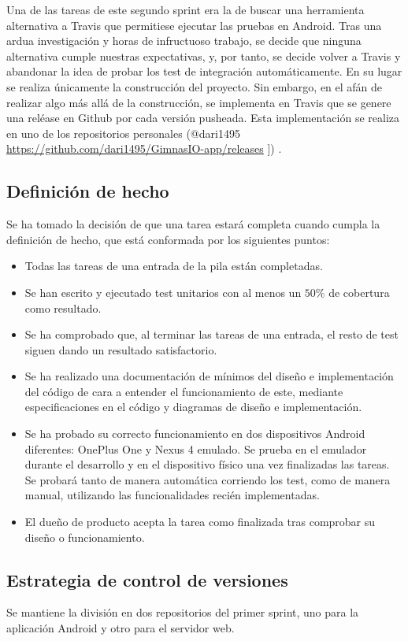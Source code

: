 \documentclass[11pt,a4paper]{report}
\begin{document}
Una de las tareas de este segundo sprint era la de buscar una herramienta alternativa a Travis que permitiese ejecutar las pruebas en Android. Tras una ardua investigación y horas de infructuoso trabajo, se decide que ninguna alternativa cumple nuestras expectativas, y, por tanto, se decide volver a Travis y abandonar la idea de probar los test de integración automáticamente. En su lugar se realiza únicamente la construcción del proyecto. Sin embargo, en el afán de realizar algo más allá de la construcción, se implementa en Travis que se genere una reléase en Github por cada versión pusheada. Esta implementación se realiza en uno de los repositorios personales (@dari1495 \url{https://github.com/dari1495/GimnasIO-app/releases} ]) .
\subsection{Definición de hecho}
Se ha tomado la decisión de que una tarea estará completa cuando cumpla la definición de hecho, que está conformada por los siguientes puntos:
\begin{itemize}
	\item Todas las tareas de una entrada de la pila están completadas.
	\item Se han escrito y ejecutado test unitarios con al menos un $50\%$ de cobertura como resultado.
	\item Se ha comprobado que, al terminar las tareas de una entrada, el resto de test siguen dando un resultado satisfactorio.
	\item Se ha realizado una documentación de mínimos del diseño e implementación del código de cara a entender el funcionamiento de este, mediante especificaciones en el código y diagramas de diseño e implementación.
	\item Se ha probado su correcto funcionamiento en dos dispositivos Android diferentes: OnePlus One y Nexus 4 emulado. Se prueba en el emulador durante el desarrollo y en el dispositivo físico una vez finalizadas las tareas. Se probará tanto de manera automática corriendo los test, como de manera manual, utilizando las funcionalidades recién implementadas.
	\item El dueño de producto acepta la tarea como finalizada tras comprobar su diseño o funcionamiento.
\end{itemize}
\subsection{Estrategia de control de versiones}
Se mantiene la división en dos repositorios del primer sprint, uno para la aplicación Android y otro para el servidor web. 
\end{document}

